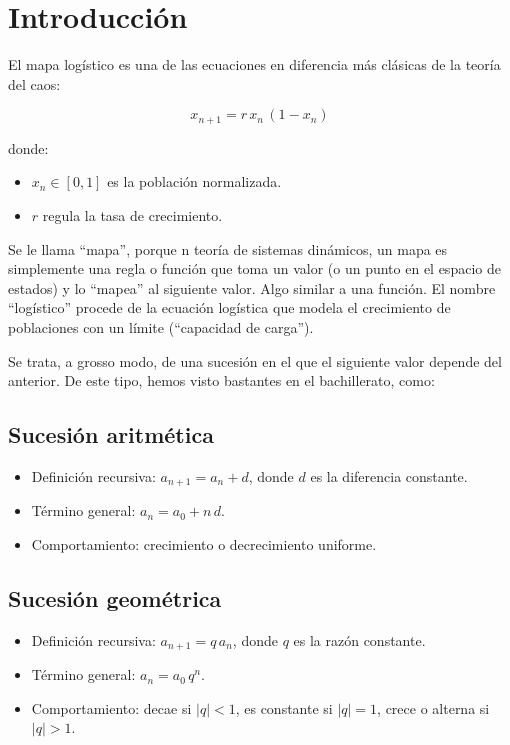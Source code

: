 \documentclass[
  11pt,
  a4paper,
  DIV=11,
  numbers=noendperiod]{scrreprt}
\providecommand{\tightlist}{%
  \setlength{\itemsep}{0pt}\setlength{\parskip}{0pt}}
\begin{document}
\section{Introducción}\label{introducciuxf3n-1}

El mapa logístico es una de las ecuaciones en diferencia más clásicas de
la teoría del caos:

\[
x_{n+1} = r\,x_n\,(1 - x_n)
\]

donde:

\begin{itemize}
\tightlist
\item
  \(x_n \in [0,1]\) es la población normalizada.
\item
  \(r\) regula la tasa de crecimiento.
\end{itemize}

Se le llama ``mapa'', porque n teoría de sistemas dinámicos, un mapa es
simplemente una regla o función que toma un valor (o un punto en el
espacio de estados) y lo ``mapea'' al siguiente valor. Algo similar a
una función. El nombre ``logístico'' procede de la ecuación logística
que modela el crecimiento de poblaciones con un límite (``capacidad de
carga'').

Se trata, a grosso modo, de una sucesión en el que el siguiente valor
depende del anterior. De este tipo, hemos visto bastantes en el
bachillerato, como:

\subsection{Sucesión aritmética}\label{sucesiuxf3n-aritmuxe9tica}

\begin{itemize}
\tightlist
\item
  Definición recursiva: \(a_{n+1} = a_n + d\), donde \(d\) es la
  diferencia constante.\\
\item
  Término general: \(a_n = a_0 + n\,d\).\\
\item
  Comportamiento: crecimiento o decrecimiento uniforme.
\end{itemize}

\subsection{Sucesión geométrica}\label{sucesiuxf3n-geomuxe9trica}

\begin{itemize}
\tightlist
\item
  Definición recursiva: \(a_{n+1} = q\,a_n\), donde \(q\) es la razón
  constante.\\
\item
  Término general: \(a_n = a_0\,q^n\).\\
\item
  Comportamiento: decae si \(|q|<1\), es constante si \(|q|=1\), crece o
  alterna si \(|q|>1\).
\end{itemize}
\end{document}
